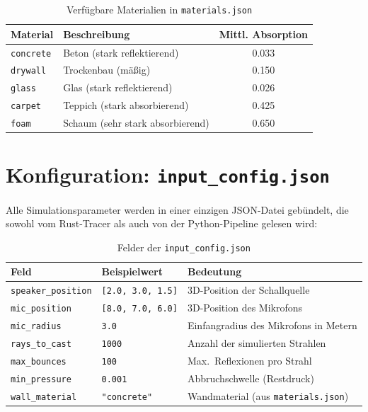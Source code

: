 \documentclass[11pt,a4paper,twoside]{report}
\begin{document}
\begin{table}[H]
    \centering
    \begin{tabular}{|l|l|c|}
        \hline
        \textbf{Material} & \textbf{Beschreibung} & \textbf{Mittl. Absorption} \\
        \hline
        \texttt{concrete} & Beton (stark reflektierend) & 0.033 \\
        \hline
        \texttt{drywall}  & Trockenbau (m\"a\ss{}ig) & 0.150 \\
        \hline
        \texttt{glass}    & Glas (stark reflektierend) & 0.026 \\
        \hline
        \texttt{carpet}   & Teppich (stark absorbierend) & 0.425 \\
        \hline
        \texttt{foam}     & Schaum (sehr stark absorbierend) & 0.650 \\
        \hline
    \end{tabular}
    \caption{Verf\"ugbare Materialien in \texttt{materials.json}}
\end{table}

\section{Konfiguration: \texttt{input\_config.json}}

Alle Simulationsparameter werden in einer einzigen JSON-Datei geb\"undelt,
die sowohl vom Rust-Tracer als auch von der Python-Pipeline gelesen wird:

\begin{table}[H]
    \centering
    \begin{tabular}{|l|l|p{5.5cm}|}
        \hline
        \textbf{Feld} & \textbf{Beispielwert} & \textbf{Bedeutung} \\
        \hline
        \texttt{speaker\_position} & \texttt{[2.0, 3.0, 1.5]} & 3D-Position der Schallquelle \\
        \hline
        \texttt{mic\_position} & \texttt{[8.0, 7.0, 6.0]} & 3D-Position des Mikrofons \\
        \hline
        \texttt{mic\_radius} & \texttt{3.0} & Einfangradius des Mikrofons in Metern \\
        \hline
        \texttt{rays\_to\_cast} & \texttt{1000} & Anzahl der simulierten Strahlen \\
        \hline
        \texttt{max\_bounces} & \texttt{100} & Max.\ Reflexionen pro Strahl \\
        \hline
        \texttt{min\_pressure} & \texttt{0.001} & Abbruchschwelle (Restdruck) \\
        \hline
        \texttt{wall\_material} & \texttt{"concrete"} & Wandmaterial (aus \texttt{materials.json}) \\
        \hline
    \end{tabular}
    \caption{Felder der \texttt{input\_config.json}}
\end{table}
\end{document}
